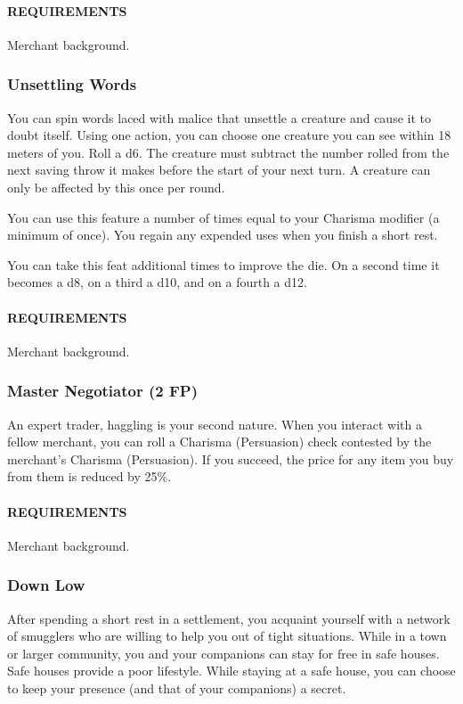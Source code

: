        \paragraph{REQUIREMENTS} Merchant background.

    \subsubsection{Unsettling Words} \label{feat::unsettlingwords}
        You can spin words laced with malice that unsettle a creature and cause it to doubt itself.
        Using one action, you can choose one creature you can see within 18 meters of you.
        Roll a d6.
        The creature must subtract the number rolled from the next saving throw it makes before the start of your next turn.
        A creature can only be affected by this once per round.

        You can use this feature a number of times equal to your Charisma modifier (a minimum of once).
        You regain any expended uses when you finish a short rest.

        You can take this feat additional times to improve the die.
        On a second time it becomes a d8, on a third a d10, and on a fourth a d12.
        \paragraph{REQUIREMENTS} Merchant background.

    \subsubsection{Master Negotiator (2 FP)} \label{feat::masternegotiator}
        An expert trader, haggling is your second nature.
        When you interact with a fellow merchant, you can roll a Charisma (Persuasion) check contested by the merchant's Charisma (Persuasion).
        If you succeed, the price for any item you buy from them is reduced by 25\%.
        \paragraph{REQUIREMENTS} Merchant background.

    \subsubsection{Down Low} \label{feat::downlow}
        After spending a short rest in a settlement, you acquaint yourself with a network of smugglers who are willing to help you out of tight situations.
        While in a town or larger community, you and your companions can stay for free in safe houses.
        Safe houses provide a poor lifestyle.
        While staying at a safe house, you can choose to keep your presence (and that of your companions) a secret.

